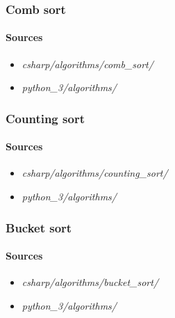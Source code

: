 \documentclass{article}
\begin{document}
\subsubsection{Comb sort}
\paragraph{Sources}
\begin{itemize}
\item{{\em csharp/algorithms/comb\_sort/}}
\item{{\em python\_3/algorithms/}}
\end{itemize}

\subsubsection{Counting sort}
\paragraph{Sources}
\begin{itemize}
\item{{\em csharp/algorithms/counting\_sort/}}
\item{{\em python\_3/algorithms/}}
\end{itemize}


\subsubsection{Bucket sort}
\paragraph{Sources}
\begin{itemize}
\item{{\em csharp/algorithms/bucket\_sort/}}
\item{{\em python\_3/algorithms/}}
\end{itemize}
\end{document}
